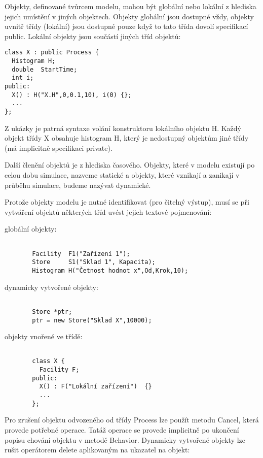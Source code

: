 \documentclass[a4paper]{article}
\begin{document}
Objekty, definované tvůrcem modelu, mohou být globální nebo
lokální z hlediska jejich umístění v jiných objektech. Objekty
globální jsou dostupné vždy, objekty uvnitř třídy (lokální) jsou
dostupné pouze když to tato třída dovolí specifikací public.
Lokální objekty jsou součástí jiných tříd objektů:

\begin{verbatim}
class X : public Process {
  Histogram H;
  double  StartTime;
  int i;
public:
  X() : H("X.H",0,0.1,10), i(0) {};
  ...
};
\end{verbatim}

Z ukázky je patrná syntaxe volání konstruktoru lokálního objektu
H. Každý objekt třídy X obsahuje histogram H, který je
nedostupný objektům jiné třídy (má implicitně specifikaci
private).

Další členění objektů je z hlediska časového. Objekty, které
v modelu existují po celou dobu simulace, nazveme statické
a objekty, které vznikají a zanikají v průběhu simulace, budeme
nazývat dynamické.

Protože objekty modelu je nutné identifikovat (pro čitelný
výstup), musí se při vytváření objektů některých tříd uvést
jejich textové pojmenování:

\begin{description}
\item[globální objekty:]
\begin{verbatim}

  Facility  F1("Zařízení 1");
  Store     S1("Sklad 1", Kapacita);
  Histogram H("Četnost hodnot x",Od,Krok,10);
\end{verbatim}

\item[dynamicky vytvořené objekty:]
\begin{verbatim}

  Store *ptr;
  ptr = new Store("Sklad X",10000);
\end{verbatim}

\item[objekty vnořené ve třídě:]
\begin{verbatim}

  class X {
    Facility F;
  public:
    X() : F("Lokální zařízení")  {}
    ...
  };
\end{verbatim}

\end{description}

Pro zrušení objektu odvozeného od třídy Process lze použít
metodu Cancel, která provede potřebné operace. Tatáž operace se
provede implicitně po ukončení popisu chování objektu v metodě
Behavior. Dynamicky vytvořené objekty lze rušit operátorem
delete aplikovaným na ukazatel na objekt:
\end{document}
